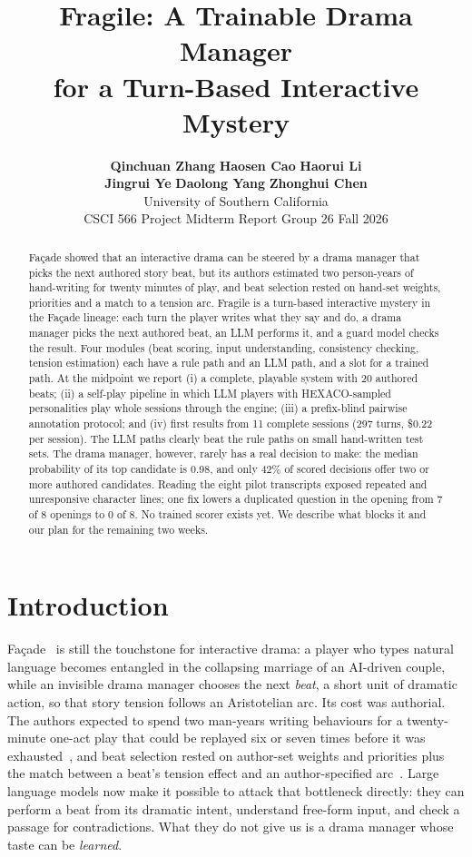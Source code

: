 \documentclass{article}
\title{Fragile: A Trainable Drama Manager\\for a Turn-Based Interactive Mystery}
\author{%
  \textbf{Qinchuan Zhang} \qquad \textbf{Haosen Cao} \qquad \textbf{Haorui Li} \\
  \textbf{Jingrui Ye} \qquad \textbf{Daolong Yang} \qquad \textbf{Zhonghui Chen} \\[1.5mm]
  \normalfont University of Southern California \\
  \normalfont CSCI 566 Project Midterm Report \quad Group 26 \quad Fall 2026
}
\newcommand{\fac}{Fa\c{c}ade}
\begin{document}
\maketitle

\begin{abstract}
\fac{} showed that an interactive drama can be steered by a drama manager that picks the next authored story beat, but its authors estimated two person-years of hand-writing for twenty minutes of play, and beat selection rested on hand-set weights, priorities and a match to a tension arc. Fragile is a turn-based interactive mystery in the \fac{} lineage: each turn the player writes what they say and do, a drama manager picks the next authored beat, an LLM performs it, and a guard model checks the result. Four modules (beat scoring, input understanding, consistency checking, tension estimation) each have a rule path and an LLM path, and a slot for a trained path. At the midpoint we report (i) a complete, playable system with 20 authored beats; (ii) a self-play pipeline in which LLM players with HEXACO-sampled personalities play whole sessions through the engine; (iii) a prefix-blind pairwise annotation protocol; and (iv) first results from 11 complete sessions (297 turns, \$0.22 per session). The LLM paths clearly beat the rule paths on small hand-written test sets. The drama manager, however, rarely has a real decision to make: the median probability of its top candidate is 0.98, and only 42\% of scored decisions offer two or more authored candidates. Reading the eight pilot transcripts exposed repeated and unresponsive character lines; one fix lowers a duplicated question in the opening from 7 of 8 openings to 0 of 8. No trained scorer exists yet. We describe what blocks it and our plan for the remaining two weeks.
\end{abstract}

\section{Introduction}

\fac{}~\citep{mateas2003facade,mateas2005structuring} is still the touchstone for interactive drama: a player who types natural language becomes entangled in the collapsing marriage of an AI-driven couple, while an invisible drama manager chooses the next \emph{beat}, a short unit of dramatic action, so that story tension follows an Aristotelian arc. Its cost was authorial. The authors expected to spend two man-years writing behaviours for a twenty-minute one-act play that could be replayed six or seven times before it was exhausted~\citep{mateas2003facade}, and beat selection rested on author-set weights and priorities plus the match between a beat's tension effect and an author-specified arc~\citep{mateas2005structuring}. Large language models now make it possible to attack that bottleneck directly: they can perform a beat from its dramatic intent, understand free-form input, and check a passage for contradictions. What they do not give us is a drama manager whose taste can be \emph{learned}.
\end{document}
